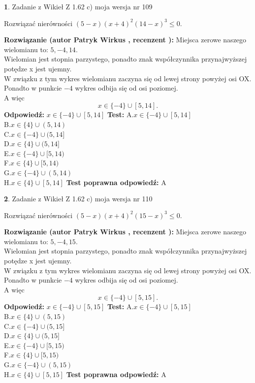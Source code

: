 \documentclass[12pt, a4paper]{article}
\theoremstyle{definition} %
\newtheorem{zad}{}
\newcommand{\zadStart}[1]{\begin{zad}#1\newline}
\newcommand{\zadStop}{\end{zad}}
\newcommand{\rozwStart}[2]{\noindent \textbf{Rozwiązanie (autor #1 , recenzent #2): }\newline}
\newcommand{\rozwStop}{\newline}
\newcommand{\odpStart}{\noindent \textbf{Odpowiedź:}\newline}
\newcommand{\odpStop}{\newline}
\newcommand{\testStart}{\noindent \textbf{Test:}\newline}
\newcommand{\testStop}{\newline}
\newcommand{\kluczStart}{\noindent \textbf{Test poprawna odpowiedź:}\newline}
\newcommand{\kluczStop}{\newline}
\begin{document}
\zadStart{Zadanie z Wikieł Z 1.62 c) moja wersja nr 109}

Rozwiązać nierówności $(5-x)(x+4)^{2}(14-x)^{3}\le0$.
\zadStop
\rozwStart{Patryk Wirkus}{}
Miejsca zerowe naszego wielomianu to: $5, -4, 14$.\\
Wielomian jest stopnia parzystego, ponadto znak współczynnika przy\linebreak najwyższej potędze x jest ujemny.\\ W związku z tym wykres wielomianu zaczyna się od lewej strony powyżej osi OX.\\
Ponadto w punkcie $-4$ wykres odbija się od osi poziomej.\\
A więc $$x \in \{-4\} \cup [5,14].$$
\rozwStop
\odpStart
$x \in \{-4\} \cup [5,14]$
\odpStop
\testStart
A.$x \in \{-4\} \cup [5,14]$\\
B.$x \in \{4\} \cup (5,14)$\\
C.$x \in \{-4\} \cup (5,14]$\\
D.$x \in \{4\} \cup (5,14]$\\
E.$x \in \{-4\} \cup [5,14)$\\
F.$x \in \{4\} \cup [5,14)$\\
G.$x \in \{-4\} \cup (5,14)$\\
H.$x \in \{4\} \cup [5,14]$
\testStop
\kluczStart
A
\kluczStop



\zadStart{Zadanie z Wikieł Z 1.62 c) moja wersja nr 110}

Rozwiązać nierówności $(5-x)(x+4)^{2}(15-x)^{3}\le0$.
\zadStop
\rozwStart{Patryk Wirkus}{}
Miejsca zerowe naszego wielomianu to: $5, -4, 15$.\\
Wielomian jest stopnia parzystego, ponadto znak współczynnika przy\linebreak najwyższej potędze x jest ujemny.\\ W związku z tym wykres wielomianu zaczyna się od lewej strony powyżej osi OX.\\
Ponadto w punkcie $-4$ wykres odbija się od osi poziomej.\\
A więc $$x \in \{-4\} \cup [5,15].$$
\rozwStop
\odpStart
$x \in \{-4\} \cup [5,15]$
\odpStop
\testStart
A.$x \in \{-4\} \cup [5,15]$\\
B.$x \in \{4\} \cup (5,15)$\\
C.$x \in \{-4\} \cup (5,15]$\\
D.$x \in \{4\} \cup (5,15]$\\
E.$x \in \{-4\} \cup [5,15)$\\
F.$x \in \{4\} \cup [5,15)$\\
G.$x \in \{-4\} \cup (5,15)$\\
H.$x \in \{4\} \cup [5,15]$
\testStop
\kluczStart
A
\kluczStop
\end{document}
